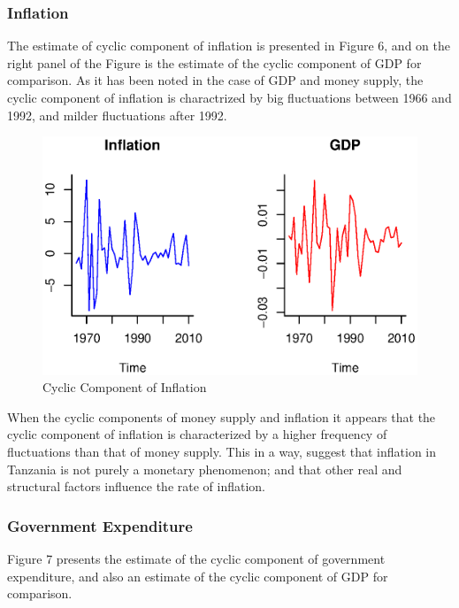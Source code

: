 \documentclass[12pt,a4paper,final]{article}
\begin{document}
\subsubsection{Inflation}

The estimate of cyclic component of inflation is presented in Figure 6, and on the right panel of the Figure is the estimate of the cyclic component of GDP for comparison. As it has been noted in the case of GDP and money supply, the cyclic component of inflation is charactrized by big fluctuations between 1966 and 1992, and milder fluctuations after 1992. 

\begin{figure}[ht]
\centering
\begin{small}
\caption{Cyclic Component of Inflation}
\end{small}
\includegraphics[scale=0.601]{inflation.eps} 
\end{figure}

When the cyclic components of money supply and inflation it appears that the cyclic component of inflation is characterized by a higher frequency of fluctuations than that of money supply. This in a way, suggest that inflation in Tanzania is not purely a monetary phenomenon; and that other real and structural factors influence the rate of inflation.

\subsubsection{Government Expenditure}

Figure 7 presents the estimate of the cyclic component of government expenditure, and also an estimate of the cyclic component of GDP for comparison.
\end{document}
